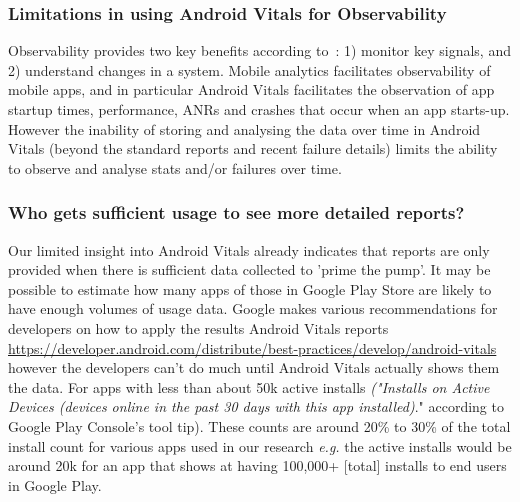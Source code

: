 \subsubsection{Limitations in using Android Vitals for Observability}
Observability provides two key benefits according to~\citealp{lightstephq2021_observability_will_never_replace_monitoring}: 1) monitor key signals, and 2) understand changes in a system. Mobile analytics facilitates observability of mobile apps, and in particular Android Vitals facilitates the observation of app startup times, performance, ANRs and crashes that occur when an app starts-up. However the inability of storing and analysing the data over time in Android Vitals (beyond the standard reports and recent failure details) limits the ability to observe and analyse stats and/or failures over time.



\subsubsection{Who gets sufficient usage to see more detailed reports?}
Our limited insight into Android Vitals already indicates that reports are only provided when there is sufficient data collected to 'prime the pump'. It may be possible to estimate how many apps of those in Google Play Store are likely to have enough volumes of usage data. Google makes various recommendations for developers on how to apply the results Android Vitals reports \url{https://developer.android.com/distribute/best-practices/develop/android-vitals} however the developers can't do much until Android Vitals actually shows them the data. For apps with less than about 50k active installs \textit{("Installs on Active Devices (devices online in the past 30 days with this app installed)}." according to Google Play Console's tool tip). These counts are around 20\% to 30\% of the total install count for various apps used in our research \textit{e.g.} the active installs would be around 20k for an app that shows at having 100,000+ [total] installs to end users in Google Play.

